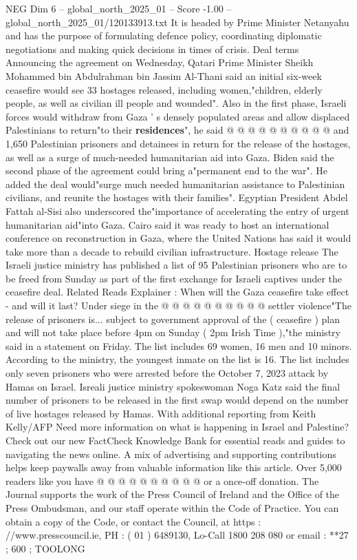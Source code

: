 \begin{textsample}{NEG Dim 6 – global\_north\_2025\_01 – Score -1.00 – global\_north\_2025\_01/120133913.txt}
It is headed by Prime Minister Netanyahu and has the purpose of formulating defence policy, coordinating diplomatic negotiations and making quick decisions in times of crisis.
Deal terms Announcing the agreement on Wednesday, Qatari Prime Minister Sheikh Mohammed bin Abdulrahman bin Jassim Al-Thani said an initial six-week ceasefire would see 33 hostages released, including women,"children, elderly people, as well as civilian ill people and wounded".
Also in the first phase, Israeli forces would withdraw from Gaza ' s densely populated areas and allow displaced Palestinians to return"to their \textbf{residences}", he said @ @ @ @ @ @ @ @ @ @ and 1,650 Palestinian prisoners and detainees in return for the release of the hostages, as well as a surge of much-needed humanitarian aid into Gaza.
Biden said the second phase of the agreement could bring a"permanent end to the war".
He added the deal would"surge much needed humanitarian assistance to Palestinian civilians, and reunite the hostages with their families".
Egyptian President Abdel Fattah al-Sisi also underscored the"importance of accelerating the entry of urgent humanitarian aid"into Gaza.
Cairo said it was ready to host an international conference on reconstruction in Gaza, where the United Nations has said it would take more than a decade to rebuild civilian infrastructure.
Hostage release The Israeli justice ministry has published a list of 95 Palestinian prisoners who are to be freed from Sunday as part of the first exchange for Israeli captives under the ceasefire deal.
Related Reads Explainer : When will the Gaza ceasefire take effect - and will it last?
Under siege in the @ @ @ @ @ @ @ @ @ @ settler violence"The release of prisoners is... subject to government approval of the ( ceasefire ) plan and will not take place before 4pm on Sunday ( 2pm Irish Time ),"the ministry said in a statement on Friday.
The list includes 69 women, 16 men and 10 minors.
According to the ministry, the youngest inmate on the list is 16.
The list includes only seven prisoners who were arrested before the October 7, 2023 attack by Hamas on Israel.
Isreali justice ministry spokeswoman Noga Katz said the final number of prisoners to be released in the first swap would depend on the number of live hostages released by Hamas.
With additional reporting from Keith Kelly/AFP Need more information on what is happening in Israel and Palestine?
Check out our new FactCheck Knowledge Bank for essential reads and guides to navigating the news online.
A mix of advertising and supporting contributions helps keep paywalls away from valuable information like this article.
Over 5,000 readers like you have @ @ @ @ @ @ @ @ @ @ or a once-off donation.
The Journal supports the work of the Press Council of Ireland and the Office of the Press Ombudsman, and our staff operate within the Code of Practice.
You can obtain a copy of the Code, or contact the Council, at https : //www.presscouncil.ie, PH : ( 01 ) 6489130, Lo-Call 1800 208 080 or email : **27 ; 600 ; TOOLONG

\end{textsample}
